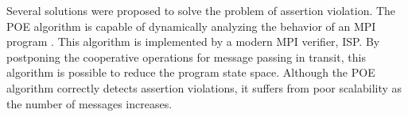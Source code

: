 %
%
% 


Several solutions were proposed to solve the problem of assertion violation. The POE algorithm is capable of dynamically analyzing the behavior of an MPI program \cite{DBLP:conf/ppopp/VakkalankaSGK08}. This algorithm is implemented by a modern MPI verifier, ISP. By postponing the cooperative operations for message passing in transit, this algorithm is possible to reduce the program state space. Although the POE algorithm correctly detects assertion violations, it suffers from poor scalability as the number of messages increases. 

